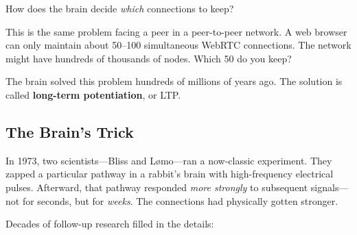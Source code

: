 \documentclass[nobib,justified]{tufte-handout}
\begin{document}
How does the brain decide \emph{which} connections to keep?

This is the same problem facing a peer in a peer-to-peer network. A web browser can only maintain about 50--100 simultaneous WebRTC connections. The network might have hundreds of thousands of nodes. Which 50 do you keep?

The brain solved this problem hundreds of millions of years ago. The solution is called \textbf{long-term potentiation}, or LTP.

\subsection{The Brain's Trick}

In 1973, two scientists---Bliss and L\o mo---ran a now-classic experiment. They zapped a particular pathway in a rabbit's brain with high-frequency electrical pulses. Afterward, that pathway responded \emph{more strongly} to subsequent signals---not for seconds, but for \emph{weeks}. The connections had physically gotten stronger.

Decades of follow-up research filled in the details:
\end{document}
